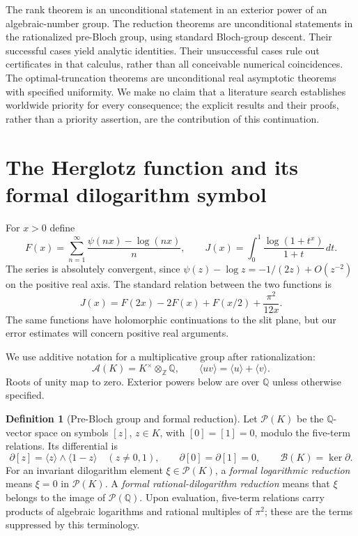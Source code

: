 \documentclass[11pt]{article}
\numberwithin{equation}{section}
\theoremstyle{definition}
\newtheorem{definition}[theorem]{Definition}
\theoremstyle{remark}
\newcommand{\Q}{\mathbb Q}
\newcommand{\Z}{\mathbb Z}
\newcommand{\Pcal}{\mathcal P}
\newcommand{\Bcal}{\mathcal B}
\newcommand{\Acal}{\mathcal A}
\newcommand{\cl}[1]{\langle #1\rangle}
\begin{document}
The rank theorem is an unconditional statement in an exterior power of
an algebraic-number group. The reduction theorems are unconditional
statements in the rationalized pre-Bloch group, using standard Bloch-group
descent. Their successful cases yield analytic identities. Their
unsuccessful cases rule out certificates in that calculus, rather than
all conceivable numerical coincidences. The optimal-truncation theorems
are unconditional real asymptotic theorems with specified uniformity.
We make no claim that a literature search establishes worldwide priority
for every consequence; the explicit results and their proofs, rather than
a priority assertion, are the contribution of this continuation.

\section{The Herglotz function and its formal dilogarithm symbol}
\label{sec:formal}

For $x>0$ define
\begin{equation}\label{eq:F-J}
 F(x)=\sum_{n=1}^{\infty}\frac{\psi(nx)-\log(nx)}n,
 \qquad J(x)=\int_0^1\frac{\log(1+t^x)}{1+t}\,dt.
\end{equation}
The series is absolutely convergent, since
$\psi(z)-\log z=-1/(2z)+O(z^{-2})$ on the positive real axis. The
standard relation between the two functions is
\begin{equation}\label{eq:J-F}
 J(x)=F(2x)-2F(x)+F(x/2)+\frac{\pi^2}{12x}.
\end{equation}
The same functions have holomorphic continuations to the slit plane, but
our error estimates will concern positive real arguments.

We use additive notation for a multiplicative group after rationalization:
\[
 \Acal(K)=K^\times\otimes_\Z\Q,
 \qquad \cl{uv}=\cl u+\cl v.
\]
Roots of unity map to zero. Exterior powers below are over $\Q$ unless
otherwise specified.

\begin{definition}[Pre-Bloch group and formal reduction]\label{def:formal}
Let $\Pcal(K)$ be the $\Q$-vector space on symbols $[z]$, $z\in K$, with
$[0]=[1]=0$, modulo the five-term relations. Its differential is
\[
 \partial[z]=\cl z\wedge\cl{1-z}\quad(z\ne0,1),
 \qquad \partial[0]=\partial[1]=0,
 \qquad \Bcal(K)=\ker\partial.
\]
For an invariant dilogarithm element $\xi\in\Pcal(K)$, a
\emph{formal logarithmic reduction} means $\xi=0$ in $\Pcal(K)$.
A \emph{formal rational-dilogarithm reduction} means that $\xi$ belongs
to the image of $\Pcal(\Q)$. Upon evaluation, five-term relations carry
products of algebraic logarithms and rational multiples of $\pi^2$;
these are the terms suppressed by this terminology.
\end{definition}
\end{document}
